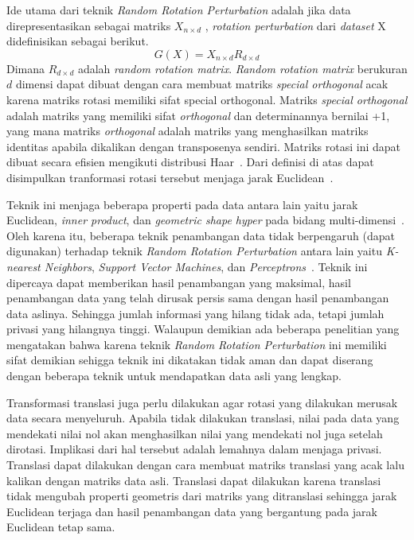 Ide utama dari teknik \textit{Random Rotation Perturbation} adalah jika data direpresentasikan sebagai matriks \(X_{n \times d}\) , \textit{rotation perturbation} dari \textit{dataset} X didefinisikan sebagai berikut.
\begin{equation}
	G(X) = X_{n \times d} R_{d \times d}
\end{equation}
Dimana \(R_{d \times d}\) adalah \textit{random rotation matrix}. \textit{Random rotation matrix} berukuran \(d\) dimensi dapat dibuat dengan cara membuat matriks \textit{special orthogonal} acak karena matriks rotasi memiliki sifat {special orthogonal}. Matriks \textit{special orthogonal} adalah matriks yang memiliki sifat \textit{orthogonal} dan determinannya bernilai +1, yang mana matriks \textit{orthogonal} adalah matriks yang menghasilkan matriks identitas apabila dikalikan dengan transposenya sendiri. Matriks rotasi ini dapat dibuat secara efisien mengikuti distribusi Haar~\cite{stewart:80:orthogonal}. Dari definisi di atas dapat disimpulkan tranformasi rotasi tersebut menjaga jarak Euclidean~\cite{rotation:05:chenliu}.

Teknik ini menjaga beberapa properti pada data antara lain yaitu jarak Euclidean, \textit{inner product}, dan \textit{geometric shape hyper} pada bidang multi-dimensi~\cite{rezaseifi:11:ppdm}. Oleh karena itu, beberapa teknik penambangan data tidak berpengaruh (dapat digunakan) terhadap teknik \textit{Random Rotation Perturbation} antara lain yaitu \textit{K-nearest Neighbors}, \textit{Support Vector Machines}, dan \textit{Perceptrons}~\cite{rotation:05:chenliu}. Teknik ini dipercaya dapat memberikan hasil penambangan yang maksimal, hasil penambangan data yang telah dirusak persis sama dengan hasil penambangan data aslinya. Sehingga jumlah informasi yang hilang tidak ada, tetapi jumlah privasi yang hilangnya tinggi. Walaupun demikian ada beberapa penelitian yang mengatakan bahwa karena teknik \textit{Random Rotation Perturbation} ini memiliki sifat demikian sehigga teknik ini dikatakan tidak aman dan dapat diserang dengan beberapa teknik untuk mendapatkan data asli yang lengkap.

Transformasi translasi juga perlu dilakukan agar rotasi yang dilakukan merusak data secara menyeluruh. Apabila tidak dilakukan translasi, nilai pada data yang mendekati nilai nol akan menghasilkan nilai yang mendekati nol juga setelah dirotasi. Implikasi dari hal tersebut adalah lemahnya dalam menjaga privasi. Translasi dapat dilakukan dengan cara membuat matriks translasi yang acak lalu kalikan dengan matriks data asli. Translasi dapat dilakukan karena translasi tidak mengubah properti geometris dari matriks yang ditranslasi sehingga jarak Euclidean terjaga dan hasil penambangan data yang bergantung pada jarak Euclidean tetap sama.

